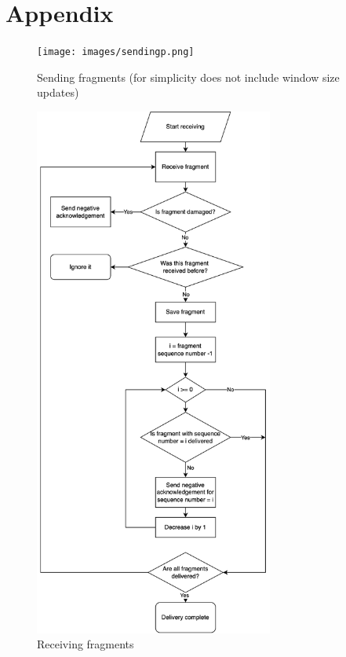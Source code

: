 \documentclass{article}
\begin{document}
\section{Appendix}

\begin{figure}[!h]
    \centering
    \texttt{[image: images/sendingp.png]}
    \caption{Sending fragments (for simplicity does not include window size updates)}
    \label{fig:mesh1}
\end{figure}

\begin{figure}[!h]
    \centering
    \includegraphics[width=0.7\textwidth]{images/receiving.png}
    \caption{Receiving fragments}
    \label{fig:mesh2}
\end{figure}
\end{document}
